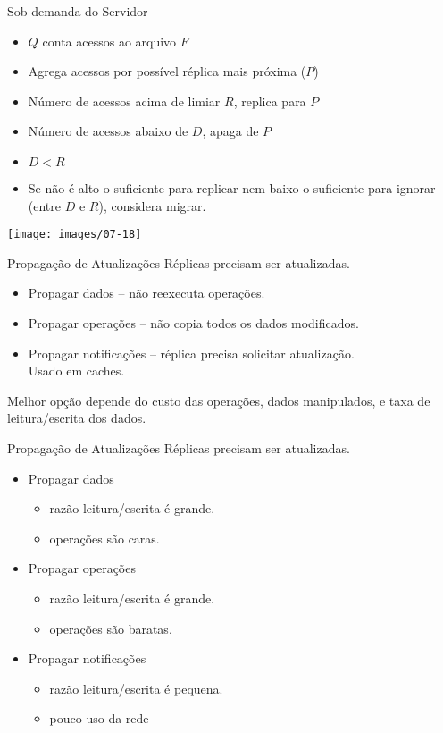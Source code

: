 \begin{frame}{Sob demanda do Servidor}
\begin{itemize}
	\item $Q$ conta acessos ao arquivo $F$
	\item Agrega acessos por possível réplica mais próxima ($P$)
	\item Número de acessos acima de limiar $R$, replica para $P$
	\item Número de acessos abaixo de $D$, apaga de $P$
	\item $D < R$
	\item Se não é alto o suficiente para replicar nem baixo o suficiente para ignorar (entre $D$ e $R$), considera migrar.
\end{itemize}

\texttt{[image: images/07-18]}
\end{frame}



\begin{frame}{Propagação de Atualizações}
Réplicas precisam ser atualizadas.\pause
\begin{itemize}
	\item Propagar dados -- não reexecuta operações.
	\item Propagar operações -- não copia todos os dados modificados.
	\pause
	\item Propagar notificações -- réplica precisa solicitar atualização.\\ Usado em caches.
\end{itemize}

Melhor opção depende do custo das operações, dados manipulados, e taxa de leitura/escrita dos dados.
\end{frame}

\begin{frame}{Propagação de Atualizações}
Réplicas precisam ser atualizadas.
\begin{itemize}
	\item Propagar dados
	\begin{itemize}
		\item razão leitura/escrita é grande.
		\item operações são caras.
	\end{itemize}
	\item Propagar operações
	\begin{itemize}
		\item razão leitura/escrita é grande.
		\item operações são baratas.
	\end{itemize}
	\item Propagar notificações
	\begin{itemize}
		\item razão leitura/escrita é pequena.
		\item pouco uso da rede
	\end{itemize}
\end{itemize}
\end{frame}



